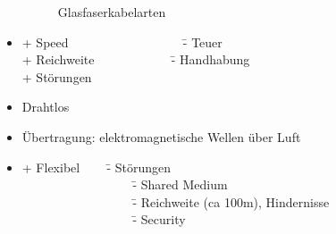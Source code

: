 \begin{itemize}
\begin{figure}[H]
		\caption{Glasfaserkabelarten}
	\end{figure}
	\item[] \begin{tabbing}
		+ Speed ~~~~~~~~~~~~~~~~~ \= - Teuer \\
		+ Reichweite ~~~~~~~~~~~ \= - Handhabung \\
		+ Störungen
	\end{tabbing}
	\item Drahtlos
	\item[] Übertragung: elektromagnetische Wellen über Luft
	\item[] \begin{tabbing}
		+ Flexibel ~~~ \= - Störungen \\
		~~~~~~~~~~~~~~~~~ \= - Shared Medium \\
		~~~~~~~~~~~~~~~~~ \= - Reichweite (ca 100m), Hindernisse \\
		~~~~~~~~~~~~~~~~~ \= - Security \\
	\end{tabbing}
\end{itemize}